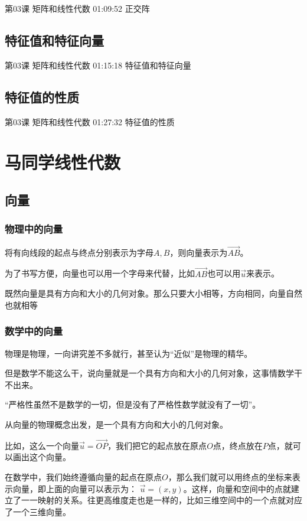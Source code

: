 \documentclass[UTF8]{ctexart}
\begin{document}
第03课 矩阵和线性代数 01:09:52 正交阵

\subsection{特征值和特征向量}

第03课 矩阵和线性代数 01:15:18 特征值和特征向量

\subsection{特征值的性质}

第03课 矩阵和线性代数 01:27:32 特征值的性质


\section{马同学线性代数}

\subsection{向量}

\subsubsection{物理中的向量}

将有向线段的起点与终点分别表示为字母$A,B$，则向量表示为$\overrightarrow{AB}$。

为了书写方便，向量也可以用一个字母来代替，比如$\overrightarrow{AB}$也可以用$\vec{u}$来表示。

既然向量是具有方向和大小的几何对象。那么只要大小相等，方向相同，向量自然也就相等

\subsubsection{数学中的向量}

物理是物理，一向讲究差不多就行，甚至认为“近似”是物理的精华。 

但是数学不能这么干，说向量就是一个具有方向和大小的几何对象，这事情数学干不出来。 

“严格性虽然不是数学的一切，但是没有了严格性数学就没有了一切”。 

从向量的物理概念出发，是一个具有方向和大小的几何对象。 

比如，这么一个向量$\vec{u}=\overrightarrow{OP}$，我们把它的起点放在原点$O$点，终点放在$P$点，就可以画出这个向量。

在数学中，我们始终遵循向量的起点在原点$O$，那么我们就可以用终点的坐标来表示向量，即上面的向量可以表示为： $\vec{u}=(x,y)$。这样，向量和空间中的点就建立了一一映射的关系。往更高维度走也是一样的，比如三维空间中的一个点就对应了一个三维向量。
\end{document}
